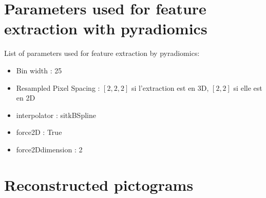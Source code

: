 \documentclass[preprint,12pt]{elsarticle}
\begin{document}
\newpage

\section{Parameters used for feature extraction with pyradiomics}
\label{annexeparam}

List of parameters used for feature extraction by pyradiomics:
 
\begin{itemize}[label = $\bullet$]
    \item Bin width : 25
    \item Resampled Pixel Spacing : $[2,2,2]$ si l'extraction est en 3D, $[2,2]$ si elle est en 2D
    \item interpolator : sitkBSpline
    \item force2D : True
    \item force2Ddimension : 2
\end{itemize}


\section{Reconstructed pictograms}
\label{annexe:picto}
\end{document}
